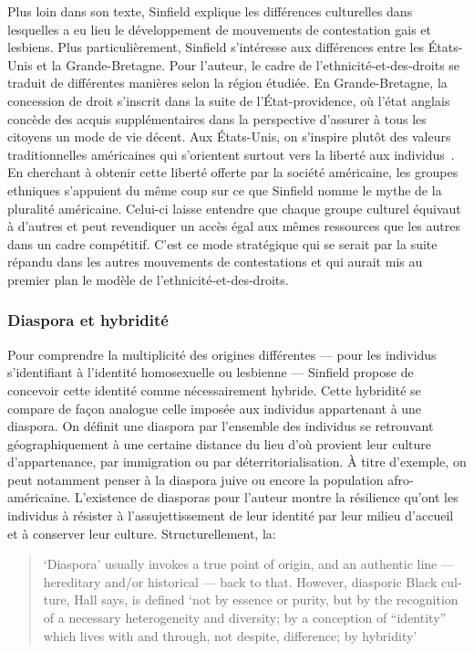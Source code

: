 Plus loin dans son texte, Sinfield explique les différences culturelles dans lesquelles a eu lieu le développement de mouvements de contestation gais et lesbiens.
Plus particulièrement, Sinfield s'intéresse aux différences entre les États-Unis et la Grande-Bretagne.
Pour l'auteur, le cadre de l'ethnicité-et-des-droits se traduit de différentes manières selon la région étudiée.
En Grande-Bretagne, la concession de droit s'inscrit dans la suite de l'État-providence, où l'état anglais concède des acquis supplémentaires dans la perspective d'assurer à tous les citoyens un mode de vie décent.
Aux États-Unis, on s'inspire plutôt des valeurs traditionnelles américaines qui s'orientent surtout vers la liberté aux individus~\citep[274]{Sinfield1996}.
En cherchant à obtenir cette liberté offerte par la société américaine, les groupes ethniques s'appuient du même coup sur ce que Sinfield nomme le mythe de la pluralité américaine.
Celui-ci laisse entendre que chaque groupe culturel équivaut à d'autres et peut revendiquer un accès égal aux mêmes ressources que les autres dans un cadre compétitif.
C'est ce mode stratégique qui se serait par la suite répandu dans les autres mouvements de contestations et qui aurait  mis au premier plan le modèle de l'ethnicité-et-des-droits.

\subsubsection{Diaspora et hybridité}
\label{sub:diaspora_et_hybridit_} Pour comprendre la multiplicité des origines différentes --- pour les individus s'identifiant à l'identité homosexuelle ou lesbienne --- Sinfield propose de concevoir cette identité comme nécessairement hybride.
Cette hybridité se compare de façon analogue celle imposée aux individus appartenant à une diaspora.
On définit une diaspora par l'ensemble des individus se retrouvant géographiquement à une certaine distance du lieu d'où provient leur culture d'appartenance, par immigration ou par déterritorialisation.
À titre d'exemple, on peut notamment penser à la diaspora juive ou encore la population afro-américaine.
L'existence de diasporas pour l'auteur montre la résilience qu'ont les individus à résister à l'assujettissement de leur identité par leur milieu d'accueil et à conserver leur culture.
Structurellement, la: \foreignblockquote{english}[{\cite[278]{Sinfield1996}}][.]{`Diaspora' \textelp{} usually invokes a true point of origin, and an authentic line --- hereditary and/or historical --- back to that. However, diasporic Black culture, Hall says, is defined `not by essence or purity, but by the recognition of a necessary heterogeneity and diversity; by a conception of ``identity'' which lives with and through, not despite, difference; by hybridity'}

